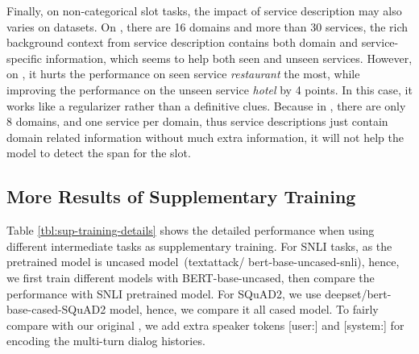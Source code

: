 Finally, on non-categorical slot tasks, the impact of service
description may also varies on datasets. On \sgdst, there are 16
domains and more than 30 services, the rich background context from
service description contains both domain and service-specific
information, which seems to help both seen and unseen
services. However, on \multiwoz, it hurts the performance on seen
service {\it restaurant} the most, while improving the performance on
the unseen service {\it hotel} by 4 points. In this case, it works
like a regularizer rather than a definitive clues. Because in
\multiwoz, there are only 8 domains, and one service per domain, thus
service descriptions just contain domain related information without
much extra information, it will not help the model to detect the span
for the slot.
%
%
%
\subsection{More Results of Supplementary Training}
\label{ssec:appendices-results-sup-training}
Table \ref{tbl:sup-training-details} shows the detailed performance
when using different intermediate tasks as supplementary training.  For
SNLI tasks, as the pretrained model is uncased model~(textattack/
bert-base-uncased-snli), hence, we first train different models with
BERT-base-uncased, then compare the performance with SNLI pretrained
model. For SQuAD2, we use deepset/bert-base-cased-SQuAD2 model, hence,
we compare it all cased model. To fairly compare with our original
\CE, we add extra speaker tokens [user:] and [system:] for encoding
the multi-turn dialog histories.

